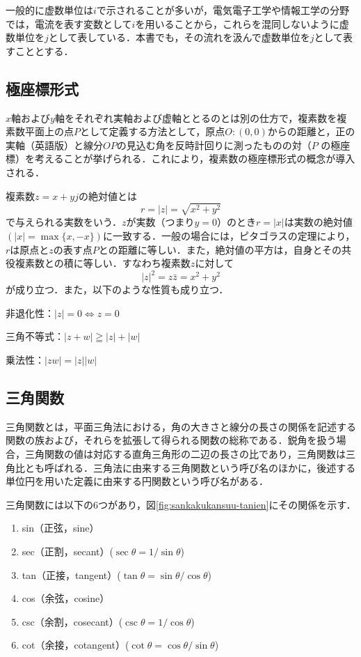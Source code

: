一般的に虚数単位は$i$で示されることが多いが，電気電子工学や情報工学の分野では，電流を表す変数として$i$を用いることから，これらを混同しないように虚数単位を$j$として表している．本書でも，その流れを汲んで虚数単位を$j$として表すこととする．

\subsection{極座標形式}

$x$軸および$y$軸をそれぞれ実軸および虚軸ととるのとは別の仕方で，複素数を複素数平面上の点$ P $として定義する方法として，原点$ O: (0,0) $からの距離と，正の実軸（英語版）と線分$ OP $の見込む角を反時計回りに測ったものの対（$P$ の極座標）を考えることが挙げられる．これにより，複素数の極座標形式の概念が導入される．

複素数$ z = x + yj $の絶対値とは
\begin{equation}
\displaystyle r=|z|={\sqrt {x^{2}+y^{2}}}
\end{equation}
で与えられる実数をいう．$z$が実数（つまり$ y = 0$）のとき$ r = |x| $は実数の絶対値$ (|x| = \max \{x, -x\}) $に一致する．一般の場合には，ピタゴラスの定理により，$r $は原点と$ z $の表す点$ P $との距離に等しい．また，絶対値の平方は，自身とその共役複素数との積に等しい．すなわち複素数$ z $に対して
\begin{equation}
{\displaystyle |z|^{2}=z{\bar {z}}=x^{2}+y^{2}}
\end{equation}
が成り立つ．また，以下のような性質も成り立つ．

非退化性：$|z| = 0 ⇔ z = 0$

三角不等式：$ |z + w| \geqq |z| + |w| $

乗法性：$ |zw| = |z||w|$

\subsection{三角関数}

三角関数とは，平面三角法における，角の大きさと線分の長さの関係を記述する関数の族および，それらを拡張して得られる関数の総称である．鋭角を扱う場合，三角関数の値は対応する直角三角形の二辺の長さの比であり，三角関数は三角比とも呼ばれる．三角法に由来する三角関数という呼び名のほかに，後述する単位円を用いた定義に由来する円関数という呼び名がある．

三角関数には以下の6つがあり，図\ref{fig:sankakukansuu-tanien}にその関係を示す．
\begin{enumerate}
\item sin（正弦，sine）
\item sec（正割，secant）($\sec \theta = 1/\sin \theta$)
\item tan（正接，tangent）($\tan \theta = \sin \theta / \cos \theta$)
\item cos（余弦，cosine）
\item csc（余割，cosecant）($\csc \theta = 1/\cos \theta$)
\item cot（余接，cotangent）($\cot \theta = \cos \theta / \sin \theta$)
\end{enumerate}

